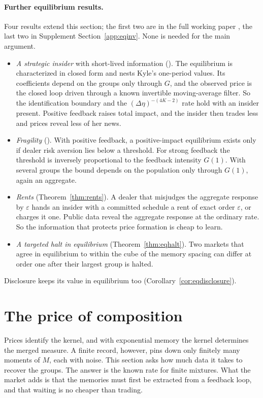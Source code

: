 \documentclass[12pt]{article}
\theoremstyle{definition}
\theoremstyle{remark}
\begin{document}
\paragraph{Further equilibrium results.} Four results extend this section; the first two are in the full working paper \citep{niroula2026full}, the last two in Supplement Section~\ref{app:eqinv}. None is needed for the main argument.
\begin{itemize}[itemsep=1pt,topsep=2pt]
\item \emph{A strategic insider} with short-lived information (\citealp[Theorem~S9.3]{niroula2026full}). The equilibrium is characterized in closed form and nests Kyle's one-period values. Its coefficients depend on the groups only through $G$, and the observed price is the closed loop driven through a known invertible moving-average filter. So the identification boundary and the $(\Delta\eta)^{-(4K-2)}$ rate hold with an insider present. Positive feedback raises total impact, and the insider then trades less and prices reveal less of her news.
\item \emph{Fragility} (\citealp[Theorem~S9.2]{niroula2026full}). With positive feedback, a positive-impact equilibrium exists only if dealer risk aversion lies below a threshold. For strong feedback the threshold is inversely proportional to the feedback intensity $G(1)$. With several groups the bound depends on the population only through $G(1)$, again an aggregate.
\item \emph{Rents} (Theorem~\ref{thm:rents}). A dealer that misjudges the aggregate response by $\varepsilon$ hands an insider with a committed schedule a rent of exact order $\varepsilon$, or charges it one. Public data reveal the aggregate response at the ordinary rate. So the information that protects price formation is cheap to learn.
\item \emph{A targeted halt in equilibrium} (Theorem~\ref{thm:eqhalt}). Two markets that agree in equilibrium to within the cube of the memory spacing can differ at order one after their largest group is halted.
\end{itemize}
Disclosure keeps its value in equilibrium too (Corollary~\ref{cor:eqdisclosure}).

\section{The price of composition}\label{sec:cost}

Prices identify the kernel, and with exponential memory the kernel determines the merged measure. A finite record, however, pins down only finitely many moments of $M$, each with noise. This section asks how much data it takes to recover the groups. The answer is the known rate for finite mixtures. What the market adds is that the memories must first be extracted from a feedback loop, and that waiting is no cheaper than trading.
\end{document}
